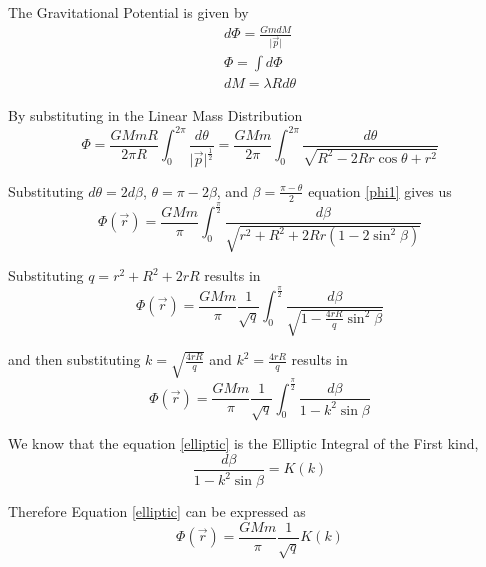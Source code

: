 \vspace{0.5\baselineskip}
The Gravitational Potential is given by
\begin{equation}
   \begin{gathered}
      d{\Phi}= \frac{GmdM}{\vert \vec{p}\vert}\\
      \Phi = \int {d{\Phi}}\\
      d M = \lambda R d \theta
   \end{gathered}
\end{equation}

\vspace{0.5\baselineskip}
By substituting in the Linear Mass Distribution
%
\begin{equation}
   \label{phi1}
   \Phi= \frac{GMmR}{2\pi R} \int_{0}^{2\pi} \frac {d \theta } {\vert \vec{p} \vert^\frac{1}{2}} = \frac{GMm}{2\pi} \int_{0}^{2\pi} \frac{d{\theta}}{\sqrt{R^2 - 2 R r \cos \theta + r^2}}
\end{equation}

Substituting $d \theta = 2 d \beta$, $\theta = \pi - 2 \beta$, and $\beta = \frac{\pi - \theta}{2}$ equation \eqref{phi1} gives us
\begin{equation}
   \label{phi2}
   \Phi (\vec{r}) = \frac{GMm}{ \pi} \int_{0}^{\frac{\pi}{2}}  \frac{d \beta }{\sqrt{r^2 + R^2 +2 R r (1 - 2 \sin^2 \beta )}}  
\end{equation}

Substituting $ q = r^2 + R^2 + 2 r R$ results in 
\begin{equation}
   \Phi (\vec{r}) = \frac{GMm}{ \pi} \frac{1}{\sqrt{q}} \int_{0}^{\frac{ \pi}{2}} \frac{d \beta }{\sqrt{1 - \frac{4 r R}{q} \sin^2 \beta}}   
\end{equation}
 
and then substituting $ k = \sqrt{\frac{4 r R }{q}} $ and $ k^2 = \frac{4 r R}{q} $ results in
\begin{equation}
   \label{elliptic}
   \Phi (\vec{r}) = \frac{GMm}{ \pi} \frac{1}{\sqrt{q}} \int_{0}^{\frac{ \pi}{2}} \frac{d \beta } {1 - k^2 \sin \beta } 
\end{equation}

We know that the equation \eqref{elliptic} is the Elliptic Integral of the First kind,
\begin{equation}
   \frac{d \beta } {1 - k^2 \sin \beta } = K (k) 
\end{equation}
 
Therefore Equation \eqref{elliptic} can be expressed as
\begin{equation}
   \Phi (\vec{r}) = \frac{GMm}{ \pi} \frac{1}{\sqrt{q}} K (k) 
\end{equation}

